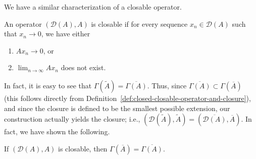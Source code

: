 We have a similar characterization of a closable operator.

\begin{Lemma}
\label{lem:closable-operator-zero-sequence-criterion}
An operator $(\mathcal{D}(A),A)$ is closable if for every sequence $x_n\in\mathcal{D}(A)$ such that $x_n\to0$, we have either\begin{enumerate}\item $Ax_n\to0$, or\item $\lim_{n\to\infty}Ax_n$ does not exist.\end{enumerate}
\end{Lemma}

\begingroup
{}
\renewcommand{\endProof}{\par\nobreak\hfill$\blacksquare$\par\vspace{0.1cm}}
\endgroup

In fact, it is easy to see that $\Gamma(\widetilde A)=\overline{\Gamma(A)}$. Thus, since $\overline{\Gamma(A)}\subset\Gamma(\overline A)$ (this follows directly from Definition~\ref{def:closed-closable-operator-and-closure}), and since the closure is defined to be the smallest possible extension, our construction actually yields the closure; i.e., $(\mathcal{D}(\widetilde A),\widetilde A)=(\overline{\mathcal{D}(A)},\overline A)$. In fact, we have shown the following.

\begin{Corollary}
\label{cor:closure-graph-is-graph-closure}
If $(\mathcal{D}(A),A)$ is closable, then $\Gamma(\overline A)=\overline{\Gamma(A)}$.
\end{Corollary}

